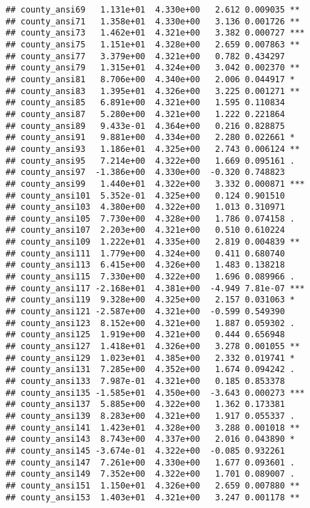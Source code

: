 \documentclass[
]{book}
\begin{document}
\begin{verbatim}
## county_ansi69   1.131e+01  4.330e+00   2.612 0.009035 ** 
## county_ansi71   1.358e+01  4.330e+00   3.136 0.001726 ** 
## county_ansi73   1.462e+01  4.321e+00   3.382 0.000727 ***
## county_ansi75   1.151e+01  4.328e+00   2.659 0.007863 ** 
## county_ansi77   3.379e+00  4.321e+00   0.782 0.434297    
## county_ansi79   1.315e+01  4.324e+00   3.042 0.002370 ** 
## county_ansi81   8.706e+00  4.340e+00   2.006 0.044917 *  
## county_ansi83   1.395e+01  4.326e+00   3.225 0.001271 ** 
## county_ansi85   6.891e+00  4.321e+00   1.595 0.110834    
## county_ansi87   5.280e+00  4.321e+00   1.222 0.221864    
## county_ansi89   9.433e-01  4.364e+00   0.216 0.828875    
## county_ansi91   9.881e+00  4.334e+00   2.280 0.022661 *  
## county_ansi93   1.186e+01  4.325e+00   2.743 0.006124 ** 
## county_ansi95   7.214e+00  4.322e+00   1.669 0.095161 .  
## county_ansi97  -1.386e+00  4.330e+00  -0.320 0.748823    
## county_ansi99   1.440e+01  4.322e+00   3.332 0.000871 ***
## county_ansi101  5.352e-01  4.325e+00   0.124 0.901510    
## county_ansi103  4.380e+00  4.322e+00   1.013 0.310971    
## county_ansi105  7.730e+00  4.328e+00   1.786 0.074158 .  
## county_ansi107  2.203e+00  4.321e+00   0.510 0.610224    
## county_ansi109  1.222e+01  4.335e+00   2.819 0.004839 ** 
## county_ansi111  1.779e+00  4.324e+00   0.411 0.680740    
## county_ansi113  6.415e+00  4.326e+00   1.483 0.138218    
## county_ansi115  7.330e+00  4.322e+00   1.696 0.089966 .  
## county_ansi117 -2.168e+01  4.381e+00  -4.949 7.81e-07 ***
## county_ansi119  9.328e+00  4.325e+00   2.157 0.031063 *  
## county_ansi121 -2.587e+00  4.321e+00  -0.599 0.549390    
## county_ansi123  8.152e+00  4.321e+00   1.887 0.059302 .  
## county_ansi125  1.919e+00  4.321e+00   0.444 0.656948    
## county_ansi127  1.418e+01  4.326e+00   3.278 0.001055 ** 
## county_ansi129  1.023e+01  4.385e+00   2.332 0.019741 *  
## county_ansi131  7.285e+00  4.352e+00   1.674 0.094242 .  
## county_ansi133  7.987e-01  4.321e+00   0.185 0.853378    
## county_ansi135 -1.585e+01  4.350e+00  -3.643 0.000273 ***
## county_ansi137  5.885e+00  4.322e+00   1.362 0.173381    
## county_ansi139  8.283e+00  4.321e+00   1.917 0.055337 .  
## county_ansi141  1.423e+01  4.328e+00   3.288 0.001018 ** 
## county_ansi143  8.743e+00  4.337e+00   2.016 0.043890 *  
## county_ansi145 -3.674e-01  4.322e+00  -0.085 0.932261    
## county_ansi147  7.261e+00  4.330e+00   1.677 0.093601 .  
## county_ansi149  7.352e+00  4.322e+00   1.701 0.089007 .  
## county_ansi151  1.150e+01  4.326e+00   2.659 0.007880 ** 
## county_ansi153  1.403e+01  4.321e+00   3.247 0.001178 ** 

\end{verbatim}
\end{document}
